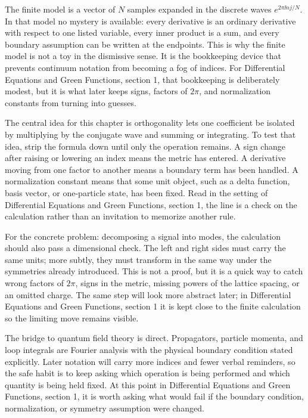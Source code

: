 The finite model is a vector of \(N\) samples expanded in the discrete waves \(e^{2\pi \ii nj/N}\).  In that model no mystery is available: every derivative is an ordinary derivative with respect to one listed variable, every inner product is a sum, and every boundary assumption can be written at the endpoints.  This is why the finite model is not a toy in the dismissive sense.  It is the bookkeeping device that prevents continuum notation from becoming a fog of indices.  For Differential Equations and Green Functions, section 1, that bookkeeping is deliberately modest, but it is what later keeps signs, factors of \(2\pi\), and normalization constants from turning into guesses.

The central idea for this chapter is orthogonality lets one coefficient be isolated by multiplying by the conjugate wave and summing or integrating.  To test that idea, strip the formula down until only the operation remains.  A sign change after raising or lowering an index means the metric has entered.  A derivative moving from one factor to another means a boundary term has been handled.  A normalization constant means that some unit object, such as a delta function, basis vector, or one-particle state, has been fixed.  Read in the setting of Differential Equations and Green Functions, section 1, the line is a check on the calculation rather than an invitation to memorize another rule.

For the concrete problem: decomposing a signal into modes, the calculation should also pass a dimensional check.  The left and right sides must carry the same units; more subtly, they must transform in the same way under the symmetries already introduced.  This is not a proof, but it is a quick way to catch wrong factors of \(2\pi\), signs in the metric, missing powers of the lattice spacing, or an omitted charge.  The same step will look more abstract later; in Differential Equations and Green Functions, section 1 it is kept close to the finite calculation so the limiting move remains visible.

The bridge to quantum field theory is direct.  Propagators, particle momenta, and loop integrals are Fourier analysis with the physical boundary condition stated explicitly.  Later notation will carry more indices and fewer verbal reminders, so the safe habit is to keep asking which operation is being performed and which quantity is being held fixed.  At this point in Differential Equations and Green Functions, section 1, it is worth asking what would fail if the boundary condition, normalization, or symmetry assumption were changed.

